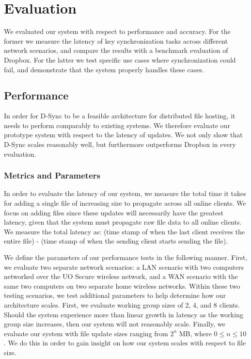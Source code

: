 \section{Evaluation}
\label{evaluation}
We evaluated our system with respect to performance and accuracy.
For the former we measure the latency of key synchronization tasks
across different network scenarios, and compare the results
with a benchmark evaluation of Dropbox. For the latter we test specific use cases
where synchronization could fail, and demonstrate that the system
properly handles these cases.

\subsection{Performance}
\label{evaluation.performance}
In order for D-Sync to be a feasible architecture
for distributed file hosting, it needs to perform comparably
to existing systems.
We therefore evaluate our prototype system with respect
to the latency of updates.
We not only show that D-Sync scales reasonably well,
but furthermore outperforms Dropbox in every evaluation.

\subsubsection{Metrics and Parameters}
In order to evaluate the latency of our system,
we measure the total time it takes for adding a single file of 
increasing size to propagate across all online clients.
We focus on adding files since these updates will necessarily
have the greatest latency, given that the system
must propagate raw file data to all online clients.
We measure the total latency as: (time stamp of when the last client receives
the entire file) - (time stamp of when the sending client starts sending the file).

We define the parameters of our performance tests in the following manner.
First, we evaluate two separate network scenarios: a LAN scenario with
two computers networked over the UO Secure wireless network,
and a WAN scenario with the same two computers on two separate home
wireless networks. 
Within these two testing scenarios,
we test additional parameters to help determine how our architecture scales.
First, we evaluate working group sizes of 2, 4, and 8 clients.
Should the system experience more than linear growth in latency
as the working group size increases, then our system will not reasonably scale.
Finally, we evaluate our system with file update sizes ranging
from $2^n$ MB, where $0 \leq n \leq 10$.
We do this in order to gain insight on how our system scales
with respect to file size.

